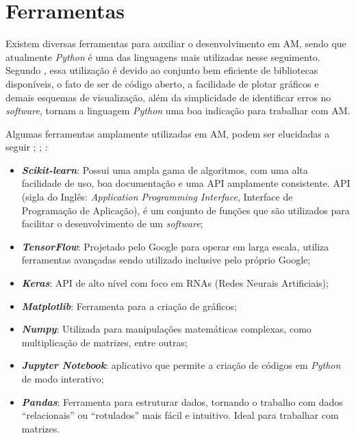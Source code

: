 \section{Ferramentas}
\label{sec:MAFerramentas}
Existem diversas ferramentas para auxiliar o desenvolvimento em AM, sendo que atualmente \textit{Python} é uma das linguagens mais utilizadas nesse seguimento. Segundo , essa utilização é devido ao conjunto bem eficiente de bibliotecas disponíveis, o fato de ser de código aberto, a facilidade de plotar gráficos e demais esquemas de visualização, além da simplicidade de identificar erros no \textit{software}, tornam a linguagem \textit{Python} uma boa indicação para trabalhar com AM.

Algumas ferramentas amplamente utilizadas em AM, podem ser elucidadas a seguir \cite{scikitlearn}; \cite{abadi2016tensorflow}; \cite{McKinney2012datapython}:
\begin{itemize}
    \item \textbf{\textit{Scikit-learn}}: Possui uma ampla gama de algoritmos, com uma alta facilidade de uso, boa documentação e uma API amplamente consistente. API (sigla do Inglês: \textit{Application Programming Interface}, Interface de Programação de Aplicação), é um conjunto de funções que são utilizados para facilitar o desenvolvimento de um \textit{software};
    \item \textbf{\textit{TensorFlow}}: Projetado pelo Google para operar em larga escala, utiliza ferramentas avançadas sendo utilizado inclusive pelo próprio Google;
    \item \textbf{\textit{Keras}}: API de alto nível com foco em RNAs (Redes Neurais Artificiais);
    \item \textbf{\textit{Matplotlib}}: Ferramenta para a criação de gráficos;
    \item \textbf{\textit{Numpy}}: Utilizada para manipulações matemáticas complexas, como multiplicação de matrizes, entre outras;
    \item \textbf{\textit{Jupyter Notebook}}: aplicativo que permite a criação de códigos em \textit{Python} de modo interativo;
    \item \textbf{\textit{Pandas}}: Ferramenta para estruturar dados, tornando o trabalho com dados “relacionais” ou “rotulados” mais fácil e intuitivo. Ideal para trabalhar com matrizes.
\end{itemize}

